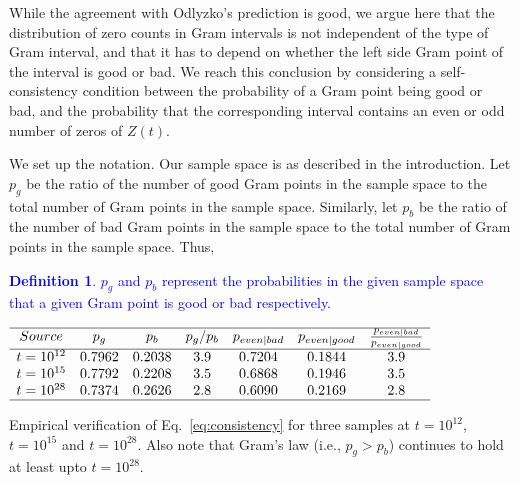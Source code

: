 \documentclass[twoside]{article}
\theoremstyle{definition}
\newtheorem{defn}{Definition}
\begin{document}
While the agreement with Odlyzko's prediction is good, we argue here that the distribution of zero counts in Gram intervals is not independent of the type of Gram interval, and that it has to depend on whether the left side Gram point of the interval is good or bad. We reach this conclusion by considering a self-consistency condition between the probability of a Gram point being good or bad, and the probability that the corresponding interval contains an even or odd number of zeros of $Z(t)$.  

We set up the notation. Our sample space is as described in the introduction. Let $p_g$ be the ratio of the number of good Gram points in the sample space to the total number of Gram points in the sample space. Similarly, let $p_b$ be the ratio of the number of bad Gram points in the sample space to the total number of Gram points in the sample space. Thus, 
\textcolor{blue}{
\begin{defn}\label{pgood}
$p_g$ and $p_b$ represent the probabilities in the given sample space that a given Gram point is good or bad respectively. 
\end{defn} 
}
\begin{table}
\centering \(\begin{array}{ccccccc}
\hline
Source &p_g&p_b& p_g/p_b&p_{even|bad} &p_{even|good}&\frac{p_{even|bad}}{p_{even|good}}\\
\hline
t = 10^{12}&0.7962&0.2038&3.9&0.7204&0.1844&3.9\\
t = 10^{15}&0.7792&0.2208&3.5&0.6868&0.1946&3.5\\
t = 10^{28}&0.7374&0.2626&2.8&0.6090&0.2169&2.8\\
\hline
\end{array}\)
\caption{Empirical verification of  Eq.~\ref{eq:consistency} for three samples at $t=10^{12}$, $t=10^{15}$  and $t=10^{28}$. Also note that Gram's law (i.e., $p_g > p_b$)  continues to hold
at least upto  $t = 10^{28}$.} 
\label{tab:pevenpred}
\end{table}
\end{document}
